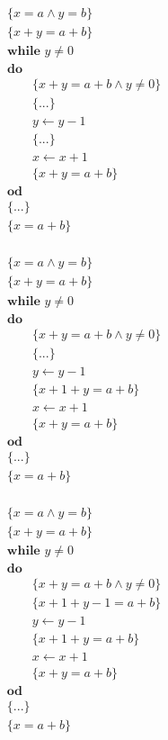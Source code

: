\begin{frame}
  \begin{align*}
    &\{x=a \land y=b\}  \\
    &\{ x+y=a+b \} \\
    &\textbf{while } y\not=0  \\
    &\textbf{do } \\
    &\qquad\{ x+y=a+b \land y\not=0 \} \\
    &\qquad\{ ... \} \\
    &\qquad y \gets y-1 \\
    &\qquad\{ ... \} \\
    &\qquad x \gets x+1 \\
    &\qquad\{ x+y=a+b \} \\
    &\textbf{od } \\
    &\{ ... \} \\
    &\{x=a+b\} \\
  \end{align*}
\end{frame}

\begin{frame}
  \begin{align*}
    &\{x=a \land y=b\}  \\
    &\{ x+y=a+b \} \\
    &\textbf{while } y\not=0  \\
    &\textbf{do } \\
    &\qquad\{ x+y=a+b \land y\not=0 \} \\
    &\qquad\{ ... \} \\
    &\qquad y \gets y-1 \\
    &\qquad\{ x+1+y=a+b \} \\
    &\qquad x \gets x+1 \\
    &\qquad\{ x+y=a+b \} \\
    &\textbf{od } \\
    &\{ ... \} \\
    &\{x=a+b\} \\
  \end{align*}
\end{frame}

\begin{frame}
  \begin{align*}
    &\{x=a \land y=b\}  \\
    &\{ x+y=a+b \} \\
    &\textbf{while } y\not=0  \\
    &\textbf{do } \\
    &\qquad\{ x+y=a+b \land y\not=0 \} \\
    &\qquad\{ x+1+y-1=a+b \} \\
    &\qquad y \gets y-1 \\
    &\qquad\{ x+1+y=a+b \} \\
    &\qquad x \gets x+1 \\
    &\qquad\{ x+y=a+b \} \\
    &\textbf{od } \\
    &\{ ... \} \\
    &\{x=a+b\} \\
  \end{align*}
\end{frame}

